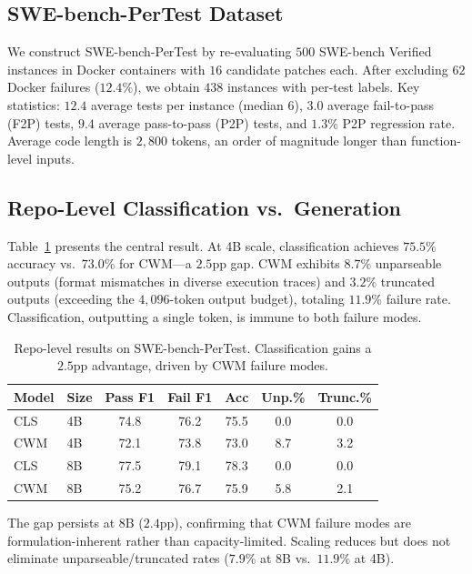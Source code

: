 \documentclass[11pt,a4paper]{article}
\begin{document}
\subsection{SWE-bench-PerTest Dataset}

We construct SWE-bench-PerTest by re-evaluating $500$ SWE-bench Verified instances in Docker containers with $16$ candidate patches each. After excluding $62$ Docker failures ($12.4\%$), we obtain $438$ instances with per-test labels. Key statistics: $12.4$ average tests per instance (median $6$), $3.0$ average fail-to-pass (F2P) tests, $9.4$ average pass-to-pass (P2P) tests, and $1.3\%$ P2P regression rate. Average code length is $2{,}800$ tokens, an order of magnitude longer than function-level inputs.

\subsection{Repo-Level Classification vs.\ Generation}

Table~\ref{tab:repo} presents the central result. At 4B scale, classification achieves $75.5\%$ accuracy vs.\ $73.0\%$ for CWM---a $2.5$pp gap. CWM exhibits $8.7\%$ unparseable outputs (format mismatches in diverse execution traces) and $3.2\%$ truncated outputs (exceeding the $4{,}096$-token output budget), totaling $11.9\%$ failure rate. Classification, outputting a single token, is immune to both failure modes.

\begin{table}[t]
\centering
\small
\caption{Repo-level results on SWE-bench-PerTest. Classification gains a $2.5$pp advantage, driven by CWM failure modes.}
\label{tab:repo}
\begin{tabular}{llccccc}
\toprule
\textbf{Model} & \textbf{Size} & \textbf{Pass F1} & \textbf{Fail F1} & \textbf{Acc} & \textbf{Unp.\%} & \textbf{Trunc.\%} \\
\midrule
CLS & 4B & 74.8 & 76.2 & 75.5 & 0.0 & 0.0 \\
CWM & 4B & 72.1 & 73.8 & 73.0 & 8.7 & 3.2 \\
CLS & 8B & 77.5 & 79.1 & 78.3 & 0.0 & 0.0 \\
CWM & 8B & 75.2 & 76.7 & 75.9 & 5.8 & 2.1 \\
\bottomrule
\end{tabular}
\end{table}

The gap persists at 8B ($2.4$pp), confirming that CWM failure modes are formulation-inherent rather than capacity-limited. Scaling reduces but does not eliminate unparseable/truncated rates ($7.9\%$ at 8B vs.\ $11.9\%$ at 4B).
\end{document}
